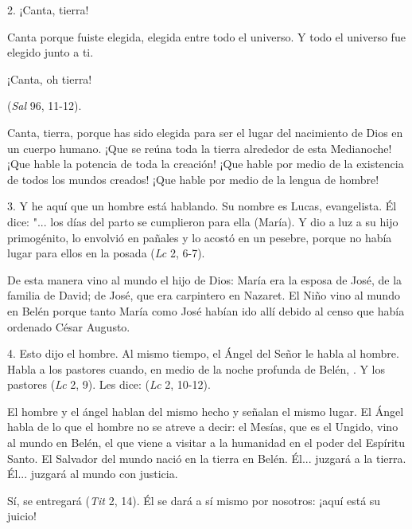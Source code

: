 \begin{body}
\begin{body}
		2. ¡Canta, tierra!
		
		Canta porque fuiste elegida, elegida entre todo el universo. Y todo el universo fue elegido junto a ti.
		
		¡Canta, oh tierra!
		
		 (\emph{Sal} 96, 11-12).
		
		Canta, tierra, porque has sido elegida para ser el lugar del nacimiento de Dios en un cuerpo humano. ¡Que se reúna toda la tierra alrededor de esta Medianoche! ¡Que hable la potencia de toda la creación! ¡Que hable por medio de la existencia de todos los mundos creados! ¡Que hable por medio de la lengua de hombre!
		
		3. Y he aquí que un hombre está hablando. Su nombre es Lucas, evangelista. Él dice: "... los días del parto se cumplieron para ella (María). Y dio a luz a su hijo primogénito, lo envolvió en pañales y lo acostó en un pesebre, porque no había lugar para ellos en la posada (\emph{Lc} 2, 6-7).
		
		De esta manera vino al mundo el hijo de Dios: María era la esposa de José, de la familia de David; de José, que era carpintero en Nazaret. El Niño vino al mundo en Belén porque tanto María como José habían ido allí debido al censo que había ordenado César Augusto.
		
		4. Esto dijo el hombre. Al mismo tiempo, el Ángel del Señor le habla al hombre. Habla a los pastores cuando, en medio de la noche profunda de Belén, . Y los pastores  (\emph{Lc} 2, 9). Les dice:  (\emph{Lc} 2, 10-12).
		
		El hombre y el ángel hablan del mismo hecho y señalan el mismo lugar. El Ángel habla de lo que el hombre no se atreve a decir: el Mesías, que es el Ungido, vino al mundo en Belén, el que viene a visitar a la humanidad en el poder del Espíritu Santo. El Salvador del mundo nació en la tierra en Belén. Él... juzgará a la tierra. Él... juzgará al mundo con justicia.
		
		Sí, se entregará  (\emph{Tit} 2, 14). Él se dará a sí mismo por nosotros: ¡aquí está su juicio!
		

\end{body}
\end{body}
